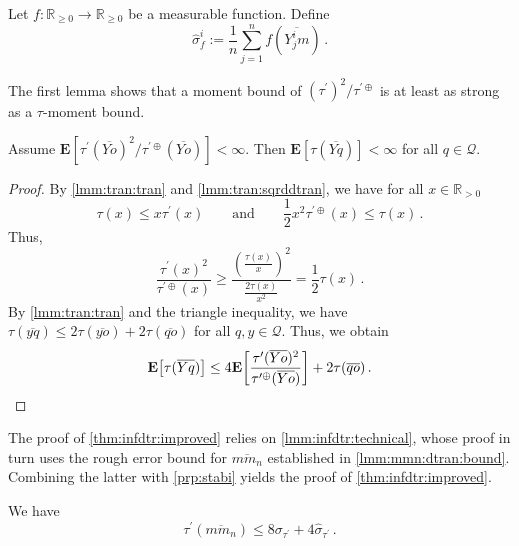 \documentclass{article}
\newcommand*{\mc}[1]{\mathcal{#1}}
\newcommand{\R}{\mathbb{R}}
\newcommand{\Rp}{\R_{\geq0}}
\newcommand{\Rpp}{\R_{>0}}
\newcommand{\lab}{\left[} %
\newcommand{\rab}{\right]} %
\newcommand{\ab}[1]{\lab #1 \rab} %
\newcommand{\abOf}[1]{\!\ab{#1}} %
\newcommand{\lb}{\left(} %
\newcommand{\rb}{\right)} %
\newcommand{\br}[1]{\lb #1 \rb} %
\newcommand{\E}{\mathbf{E}} %
\newcommand{\Eof}[1]{\E[#1]}
\newcommand{\EOf}[1]{\E\abOf{#1}}
\newcommand{\pr}{^\prime}
\newcommand{\eqfs}{\,.}
\newcommand{\ol}[2]{\overline{#1#2}}
\newcommand{\tran}{\tau}
\newcommand{\dtran}{\tau\pr}
\newcommand{\ddrtran}{\tau^{\prime\oplus}}
\begin{document}
\begin{notation}
    Let $f\colon \Rp \to \Rp$ be a measurable function. 
    Define
    \begin{equation}
        \hat\sigma_{f}^i := \frac1n \sum_{j=1}^n f(\ol {Y_j^i}m)
        \eqfs
    \end{equation}
\end{notation}
%
The first lemma shows that a moment bound of $(\dtran)^2 / \ddrtran$ is at least as strong as a $\tran$-moment bound.
%
\begin{lemma}\label{lmm:fractranmoment}
    Assume $\Eof{\dtran(\ol Yo)^2 / \ddrtran(\ol Yo)} < \infty$.
    Then $\Eof{\tran(\ol Yq)} < \infty$	for all $q\in\mc Q$.
\end{lemma}
%
\begin{proof}
    By \cref{lmm:tran:tran} and \cref{lmm:tran:sqrddtran}, we have for all $x \in \Rpp$
    \begin{equation}
        \tran(x) \leq x \dtran(x)
        \qquad\text{and}\qquad
        \frac12 x^2 \ddrtran(x) \leq \tran(x)
        \eqfs
    \end{equation}
    Thus,
    \begin{equation}\label{eq:tran:dtran2invddtran}
        \frac{\dtran(x)^2}{\ddrtran(x)} 
        \geq 
        \frac{\br{\frac{\tran(x)}x}^2}{\frac{2\tran(x)}{x^2}} = \frac12 \tran(x)
        \eqfs
    \end{equation}
    By \cref{lmm:tran:tran} and the triangle inequality, we have $\tran(\ol yq) \leq 2\tran(\ol yo) + 2\tran(\ol qo)$ for all $q,y\in\mc Q$.
    Thus, we obtain
    \begin{equation}
        \EOf{\tran(\ol Yq)} \leq 4\EOf{\frac{\dtran(\ol Yo)^2}{\ddrtran(\ol Yo)}} + 2\tran(\ol qo)
        \eqfs
        \qedhere
    \end{equation}
\end{proof}
%
The proof of \cref{thm:infdtr:improved} relies on \cref{lmm:infdtr:technical}, whose proof in turn uses the rough error bound for $\ol{m}{m_n}$ established in \cref{lmm:mmn:dtran:bound}. Combining the latter with \cref{prp:stabi} yields the proof of \cref{thm:infdtr:improved}.
%
\begin{lemma}\label{lmm:mmn:dtran:bound}
    We have
    \begin{equation}
        \dtran(\ol m{m_n})
        \leq
        8 \sigma_{\dtran} + 4 \hat\sigma_{\dtran}
        \eqfs
    \end{equation}
\end{lemma}
%
\end{document}
